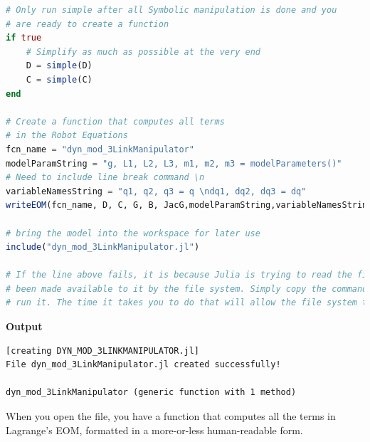 \begin{lstlisting}[language=Julia,style=mystyle]
# Only run simple after all Symbolic manipulation is done and you 
# are ready to create a function
if true
    # Simplify as much as possible at the very end
    D = simple(D)
    C = simple(C)
end

# Create a function that computes all terms
# in the Robot Equations
fcn_name = "dyn_mod_3LinkManipulator"
modelParamString = "g, L1, L2, L3, m1, m2, m3 = modelParameters()"
# Need to include line break command \n
variableNamesString = "q1, q2, q3 = q \ndq1, dq2, dq3 = dq"
writeEOM(fcn_name, D, C, G, B, JacG,modelParamString,variableNamesString)

# bring the model into the workspace for later use
include("dyn_mod_3LinkManipulator.jl") 

# If the line above fails, it is because Julia is trying to read the file before it has 
# been made available to it by the file system. Simply copy the command into a new cell and 
# run it. The time it takes you to do that will allow the file system to catch up! :-)
\end{lstlisting}
\textbf{Output} 
\begin{verbatim}
[creating DYN_MOD_3LINKMANIPULATOR.jl]
File dyn_mod_3LinkManipulator.jl created successfully!

dyn_mod_3LinkManipulator (generic function with 1 method)
\end{verbatim}

When you open the file, you have a function that computes all the terms in Lagrange's EOM, formatted in a more-or-less human-readable form.\\

